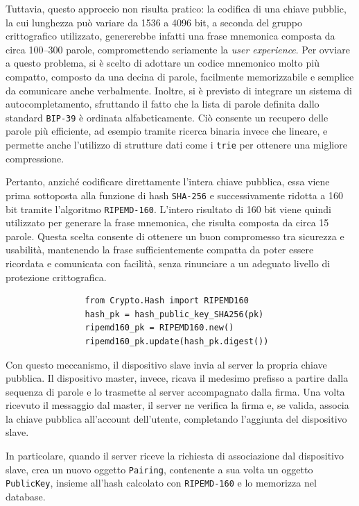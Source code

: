 Tuttavia, questo approccio non risulta pratico: la codifica di una chiave pubblic, la cui lunghezza può variare da 1536 a 4096 bit, a seconda del gruppo crittografico utilizzato, genererebbe infatti una frase mnemonica composta da circa 100–300 parole, compromettendo seriamente la \textit{user experience}.
Per ovviare a questo problema, si è scelto di adottare un codice mnemonico molto più compatto, composto da una decina di parole, facilmente memorizzabile e semplice da comunicare anche verbalmente.
Inoltre, si è previsto di integrare un sistema di autocompletamento, sfruttando il fatto che la lista di parole definita dallo standard \texttt{BIP-39} è ordinata alfabeticamente. Ciò consente un recupero delle parole più efficiente, ad esempio tramite ricerca binaria invece che lineare, e permette anche l'utilizzo di strutture dati come i \texttt{trie} per ottenere una migliore compressione. 

Pertanto, anziché codificare direttamente l’intera chiave pubblica, essa viene prima sottoposta alla funzione di hash \texttt{SHA-256} e successivamente ridotta a 160 bit tramite l'algoritmo \texttt{RIPEMD-160}.
L'intero risultato di 160 bit viene quindi utilizzato per generare la frase mnemonica, che risulta composta da circa 15 parole. Questa scelta consente di ottenere un buon compromesso tra sicurezza e usabilità, mantenendo la frase sufficientemente compatta da poter essere ricordata e comunicata con facilità, senza rinunciare a un adeguato livello di protezione crittografica.

\begin{listing}[!ht]
    \begin{verbatim}
                from Crypto.Hash import RIPEMD160
                hash_pk = hash_public_key_SHA256(pk)
                ripemd160_pk = RIPEMD160.new()
                ripemd160_pk.update(hash_pk.digest())
    \end{verbatim}
\caption{Hash della chiave pubblica con \texttt{RIPEMD-160}}
\end{listing}

Con questo meccanismo, il dispositivo slave invia al server la propria chiave pubblica. Il dispositivo master, invece, ricava il medesimo prefisso a partire dalla sequenza di parole e lo trasmette al server accompagnato dalla firma.
Una volta ricevuto il messaggio dal master, il server ne verifica la firma e, se valida, associa la chiave pubblica all'account dell'utente, completando l'aggiunta del dispositivo slave.

In particolare, quando il server riceve la richiesta di associazione dal dispositivo slave, crea un nuovo oggetto \texttt{Pairing}, contenente a sua volta un oggetto \texttt{PublicKey}, insieme all'hash calcolato con \texttt{RIPEMD-160} e lo memorizza nel database. 

